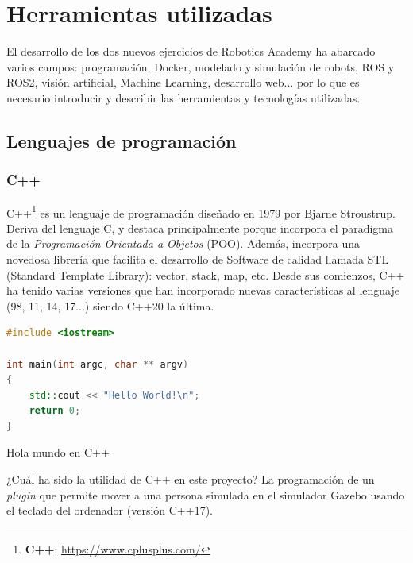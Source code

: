 \chapter{Herramientas utilizadas}
\label{cap:capitulo3}

El desarrollo de los dos nuevos ejercicios de Robotics Academy ha abarcado varios campos: programación, Docker, modelado y simulación de robots, ROS y ROS2, visión artificial, Machine Learning, desarrollo web... por lo que es necesario introducir y describir las herramientas y tecnologías utilizadas.\\



\section{Lenguajes de programación}
\label{sec:lenguajes_programacion}


\subsection{C++}
\label{subsec:c++}

C++\footnote{\textbf{C++}: \url{https://www.cplusplus.com/}} es un lenguaje de programación diseñado en 1979 por Bjarne Stroustrup. Deriva del lenguaje C, y destaca principalmente porque incorpora el paradigma de la \textit{Programación Orientada a Objetos} (POO). Además, incorpora una novedosa librería que facilita el desarrollo de Software de calidad llamada STL (Standard Template Library): vector, stack, map, etc. Desde sus comienzos, C++ ha tenido varias versiones que han incorporado nuevas características al lenguaje (98, 11, 14, 17...) siendo C++20 la última.\\

\begin{code}[H]
\begin{lstlisting}[language=C++]
#include <iostream>

int main(int argc, char ** argv)
{
	std::cout << "Hello World!\n";
	return 0;
}
\end{lstlisting}
\caption[Hola mundo en C++]{Hola mundo en C++}
\label{cod:holamundo_cplusplus}
\end{code}

¿Cuál ha sido la utilidad de C++ en este proyecto? La programación de un \textit{plugin} que permite mover a una persona simulada en el simulador Gazebo usando el teclado del ordenador (versión C++17).\\




